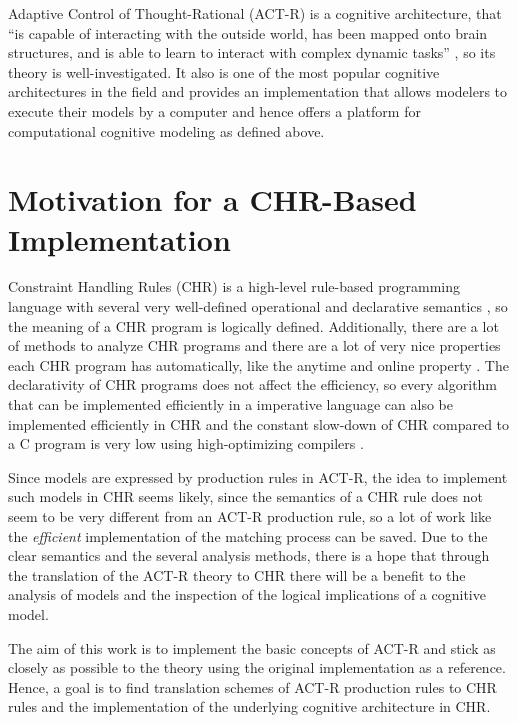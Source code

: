 Adaptive Control of Thought-Rational  (ACT-R) is a cognitive architecture, that ``is capable of interacting with the outside world, has been mapped onto brain structures, and is able to learn to interact with complex dynamic tasks'' \cite[29]{taatgen_modeling_2006}, so its theory is well-investigated. It also is one of the most popular cognitive architectures in the field \cite{rutledge2005can} and provides an implementation that allows modelers to execute their models by a computer and hence offers a platform for computational cognitive modeling as defined above.

\section{Motivation for a CHR-Based Implementation}

Constraint Handling Rules (CHR) is a high-level rule-based programming language with several very well-defined operational and declarative semantics \cite[49\psqq]{fru_chr_book_2009}, so the meaning of a CHR program is logically defined. Additionally, there are a lot of methods to analyze CHR programs \cite[96\psqq]{fru_chr_book_2009} and there are a lot of very nice properties each CHR program has automatically, like the anytime and online property \cite[83\psqq]{fru_chr_book_2009}. The declarativity of CHR programs does not affect the efficiency, so every algorithm that can be implemented efficiently in a imperative language can also be implemented efficiently in CHR and the constant slow-down of CHR compared to a C program is very low using high-optimizing compilers \cite[94]{fru_chr_book_2009}.

Since models are expressed by production rules in ACT-R, the idea to implement such models in CHR seems likely, since the semantics of a CHR rule does not seem to be very different from an ACT-R production rule, so a lot of work like the \emph{efficient} implementation of the matching process can be saved. Due to the clear semantics and the several analysis methods, there is a hope that through the translation of the ACT-R theory to CHR there will be a benefit to the analysis of models and the inspection of the logical implications of a cognitive model.

The aim of this work is to implement the basic concepts of ACT-R and stick as closely as possible to the theory using the original implementation as a reference. Hence, a goal is to find translation schemes of ACT-R production rules to CHR rules and the implementation of the underlying cognitive architecture in CHR.

